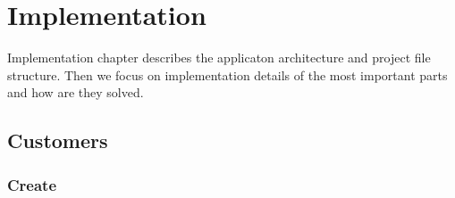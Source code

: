 \chapter{Implementation}
Implementation chapter describes the applicaton architecture and project file structure. Then we focus on implementation details of the most important parts and how are they solved.
\section {Customers}
\subsection{Create}
